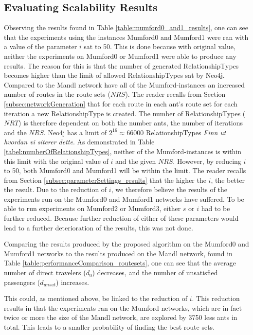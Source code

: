 \subsection{Evaluating Scalability Results}
\label{subsec:evalScalability}

Observing the results found in Table \vref{table:mumford0_and1_results}, one can see that the experiments using the  instances Mumford0 and Mumford1 were ran with a value of the parameter $i$ sat to 50. This is done because with original value, neither the experiments on Mumford0 or Mumford1 were able to produce any results. The reason for this is that the number of generated RelationshipTypes becomes higher than the limit of allowed RelationshipTypes sat by Neo4j. Compared to the Mandl network have all of the Mumford-instances an increased number of routes in the route sets ($NRS$). The reader recalls from Section \vref{subsec:networkGeneration} that for each route in each ant's route set for each iteration a new RelationshipType is created. The number of RelationshipTypes ($NRT$) is therefore dependent on both the number ants, the number of iterations and the $NRS$. Neo4j has a limit of $2^{16} \approx 66 000$ RelationshipTypes \emph{\color{blue} Finn ut hvordan vi siterer dette}. As demonstrated in Table \vref{tabel:numberOfRelationshipTypes}, neither of the Mumford-instances is within this limit with the original value of $i$ and the given $NRS$. However, by reducing $i$ to 50, both Mumford0 and Mumford1 will be within the limit. The reader recalls from Section \vref{subsec:parameterSettings_results} that the higher the $i$, the better the result. Due to the reduction of $i$, we therefore believe the results of the experiments run on the Mumford0 and Mumford1 networks have suffered. To be able to run experiments on Mumford2 or Mumford3, either $s$ or $i$ had to be further reduced. Because further reduction of either of these parameters would lead to a further deterioration of the results, this was not done.

Comparing the results produced by the proposed algorithm on the Mumford0 and Mumford1 networks to the results produced on the Mandl network, found in Table \vref{table:performanceComparison_routesets}, one can see that the average number of direct travelers ($d_0$) decreases, and the number of unsatisfied passengers ($d_{unsat}$) increases. 

This could, as mentioned above, be linked to the reduction of $i$. This reduction results in that the experiments ran on the Mumford networks, which are in fact twice or more the size of the Mandl network, are explored by 3750 less ants in total. This leads to a smaller probability of finding the best route sets.

